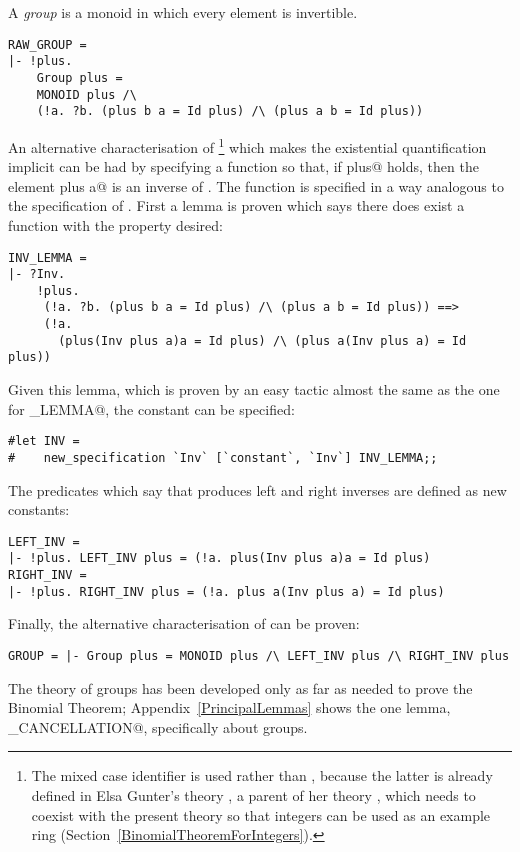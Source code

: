 A {\em group} is a monoid in which every element is invertible.
\begin{session}
\begin{verbatim}
RAW_GROUP = 
|- !plus.
    Group plus =
    MONOID plus /\
    (!a. ?b. (plus b a = Id plus) /\ (plus a b = Id plus))
\end{verbatim}
\end{session}
An alternative characterisation of \verb@Group@\footnote{
The mixed case identifier \verb@Group@ is used rather than \verb@GROUP@, 
because the latter is already defined in Elsa Gunter's theory \verb@group@, 
a parent of her theory \verb@integer@, which needs to coexist with the 
present theory so that integers can be used as an example ring 
(Section~\ref{BinomialTheoremForIntegers}).
} which makes the 
existential quantification implicit can be had by specifying a function 
\verb@Inv@ so that, if \verb@Group plus@ holds, then the element \verb@Inv 
plus a@ is an inverse of \verb@a@.  The function \verb@Inv@ is specified 
in a way analogous to the specification of \verb@Id@.  First a lemma is 
proven which says there does exist a function \verb@Inv@ with the property 
desired:
\begin{session}
\begin{verbatim}
INV_LEMMA = 
|- ?Inv.
    !plus.
     (!a. ?b. (plus b a = Id plus) /\ (plus a b = Id plus)) ==>
     (!a.
       (plus(Inv plus a)a = Id plus) /\ (plus a(Inv plus a) = Id plus))
\end{verbatim}
\end{session}
Given this lemma, which is proven by an easy tactic almost the same
as the one for \verb@ID_LEMMA@, the constant \verb@Inv@ can be specified:
\begin{session}
\begin{verbatim}
#let INV =
#    new_specification `Inv` [`constant`, `Inv`] INV_LEMMA;;
\end{verbatim}
\end{session}
The predicates which say that \verb@Inv@ produces left and right inverses
are defined as new constants:
\begin{session}
\begin{verbatim}
LEFT_INV =
|- !plus. LEFT_INV plus = (!a. plus(Inv plus a)a = Id plus)
RIGHT_INV =
|- !plus. RIGHT_INV plus = (!a. plus a(Inv plus a) = Id plus)
\end{verbatim}
\end{session}
Finally, the alternative characterisation of \verb@Group@ can be proven:
\begin{session}
\begin{verbatim}
GROUP = |- Group plus = MONOID plus /\ LEFT_INV plus /\ RIGHT_INV plus
\end{verbatim}
\end{session}
The theory of groups has been developed only as far as needed to prove 
the Binomial Theorem; Appendix~\ref{PrincipalLemmas} shows the one lemma, 
\verb@RIGHT_CANCELLATION@, specifically about groups.

